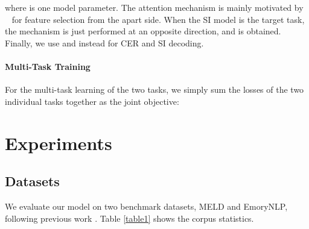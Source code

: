 \documentclass{article}
\def\newcite#1{\citeauthor{#1}~\shortcite{#1}}
\begin{document}
\begin{CJK}{UTF8}{gbsn}
where  is one model parameter. 
The attention mechanism is mainly motivated by \newcite{bahdanau2014neural} for feature selection from the apart side.
When the SI model is the target task, the mechanism is just performed at an opposite direction, and  is obtained.
Finally, we use   and  instead for CER and SI decoding.









\paragraph{Multi-Task Training}
For the multi-task learning of the two tasks, we simply sum the losses of the two individual tasks together as the joint objective:



\section{Experiments}


\begin{table}[t]
\centering
{}
\caption{Statistics of the datasets for emotion recognition in conversation. Friends is an external dataset for MTL.}
\label{table1}
\end{table}

\subsection{Datasets}
We evaluate our model on two benchmark datasets, MELD and EmoryNLP, following previous work \cite{zhong2019knowledge}. Table \ref{table1} shows the corpus statistics.


\end{CJK}
\end{document}
